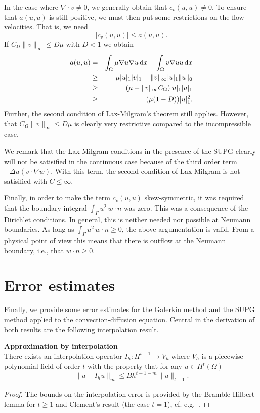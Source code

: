 In the case where $\nabla \cdot v \not = 0$, we generally obtain that $c_v(u,u) \not = 0$. 
To ensure that $a(u,u)$ is still positive, we must then put some restrictions on 
the flow velocities. That is, we need    
\[
|c_v(u,u)| \le a(u,u) .  
\]
If $C_\Omega \|v\|_\infty \le D \mu$ with $D < 1$ we obtain   
\begin{eqnarray*}
a(u,u) &=& \int_\Omega\mu\nabla u\nabla u \, \mathrm{d}x + \int_\Omega v\nabla uu \, \mathrm{d}x\\
       &\ge & \mu |u|_1 |v|_1  - \|v\|_{\infty} |u|_1 \|u\|_0 \\   
       &\ge& (\mu - \|v\|_{\infty} C_\Omega )  |u|_1 |u|_1 \\    
       &\ge& (\mu (1-D))  |u|_1^2 .    
\end{eqnarray*}
Further, the second condition of Lax-Milgram's theorem still applies.   
However, that $C_\Omega \|v\|_\infty \le D \mu$ is clearly very restrictive 
compared to the incompressible case.   

We remark that the Lax-Milgram conditions in the presence of the SUPG clearly will not 
be satisified in the continuous case because of the third order term
$ -\Delta u (v\cdot\nabla w)$. With this term, the second condition of Lax-Milgram is not satisified
with $C \le \infty$.  

Finally, in order to make the  
term $c_v(u,u)$ skew-symmetric, it was required that 
the boundary integral $\int_\Gamma u^2 \, w  \cdot n $ was zero.  
This was a consequence of the Dirichlet conditions. 
 In general, this is neither needed nor possible
at Neumann boundaries. As long as $\int_\Gamma u^2 \, w \cdot n \ge 0 $, the above argumentation is valid. From a 
physical point of view this means that there is outflow at the Neumann boundary, i.e., that $w\cdot n \ge 0$.  

\section{Error estimates}

Finally, we provide some error estimates for the
Galerkin method and the SUPG method applied to the
convection-diffusion equation. Central in the derivation
of both results are the following interpolation result.   


\begin{theorem}{\textbf{Approximation by interpolation}}\\
There exists an interpolation operator $I_h: H^{t+1} \rightarrow V_h$ 
where $V_h$ is a piecewise polynomial field of order $t$ with the property that   
for any $u\in H^t(\Omega)$ 
\[
\| u - I_h u \|_m \le  B h^{t+1-m} \|u\|_{t+1}  .  
\]
\end{theorem}
\begin{proof} %
The bounds on the interpolation error is provided by 
the Bramble-Hilbert lemma for $t\ge 1$  and Clement's result (the case $t=1$), 
cf. e.g.~\cite{braess2007finite, brenner2008mathematical}.  
\end{proof}

